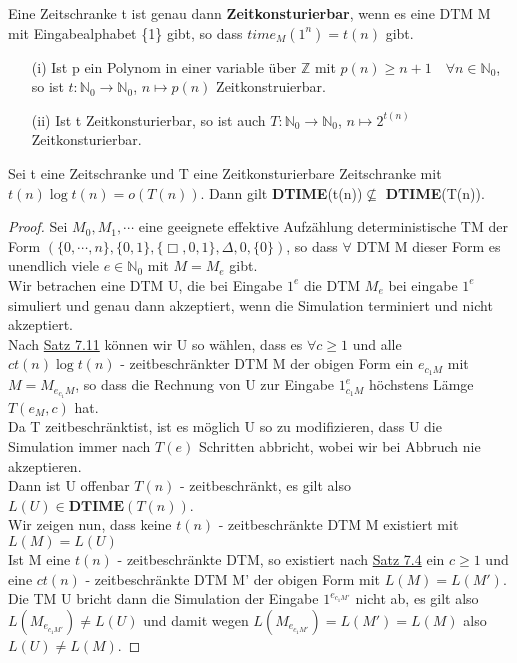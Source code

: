     Eine Zeitschranke t ist genau dann \textbf{Zeitkonsturierbar}, wenn es eine DTM M mit Eingabealphabet \{1\} gibt, so dass \(time_M(1^n) = t(n)\) gibt.

    \begin{itemize}
        \item [(i)] Ist p ein Polynom in einer variable über \(\mathbb{Z}\) mit \(p(n) \geq n+1 \quad \forall n \in \mathbb{N}_0\), so ist \(t: \mathbb{N}_0 \to \mathbb{N}_0\), \(n \mapsto p(n)\) Zeitkonstruierbar.
        \item [(ii)] Ist t Zeitkonsturierbar, so ist auch \(T: \mathbb{N}_0 \to \mathbb{N}_0\), \(n \mapsto 2^{t(n)}\) Zeitkonsturierbar.
    \end{itemize}

    Sei t eine Zeitschranke und T eine Zeitkonsturierbare Zeitschranke mit \(t(n) \log t(n) = o(T(n))\). Dann gilt \textbf{DTIME}(t(n))\(\not \subseteq\) \textbf{DTIME}(T(n)).
    \begin{proof}
        Sei \(M_0, M_1, \cdots\) eine geeignete effektive Aufzählung deterministische TM der Form \((\{0, \cdots, n\}, \{0,1\}, \{\Box, 0, 1\}, \Delta, 0, \{0\})\), so dass \(\forall\) DTM M dieser Form es unendlich viele \(e \in \mathbb{N}_0\) mit \(M = M_e\) gibt.\\Wir betrachen eine DTM U, die bei Eingabe \(1^e\) die DTM \(M_e\) bei eingabe \(1^e\) simuliert und genau dann akzeptiert, wenn die Simulation terminiert und nicht akzeptiert. \\ Nach \hyperref[subsec:7.11]{Satz 7.11} können wir U so wählen, dass es \(\forall c \geq 1\) und alle \(ct(n) \log t(n)\) - zeitbeschränkter DTM M der obigen Form ein \(e_{c_1 M}\) mit \(M = M_{e_{c_1}M}\), so dass die Rechnung von U zur Eingabe \(1^e_{c_1 M}\) höchstens Lämge \(T(e_M, c)\) hat.\\Da T zeitbeschränktist, ist es möglich U so zu modifizieren, dass U die Simulation immer nach \(T(e)\) Schritten abbricht, wobei wir bei Abbruch nie akzeptieren.\\Dann ist U offenbar \(T(n)\) - zeitbeschränkt, es gilt also \(L(U) \in \textbf{DTIME}(T(n))\). \\Wir zeigen nun, dass keine \(t(n)\) - zeitbeschränkte DTM M existiert mit \(L(M) = L(U)\)\\Ist M eine \(t(n)\) - zeitbeschränkte DTM, so existiert nach \hyperref[subsec:7.4]{Satz 7.4} ein \(c \geq 1\) und eine \(ct(n)\) - zeitbeschränkte DTM M' der obigen Form mit \(L(M) = L(M')\).\\Die TM U bricht dann die Simulation der Eingabe \(1^{e_{c_1 M'}}\) nicht ab, es gilt also \(L(M_{e_{c_1 M'}}) \not = L(U)\) und damit wegen \(L(M_{e_{c_1 M'}}) = L(M') = L(M)\) also \(L(U) \not = L(M)\).
    \end{proof}

